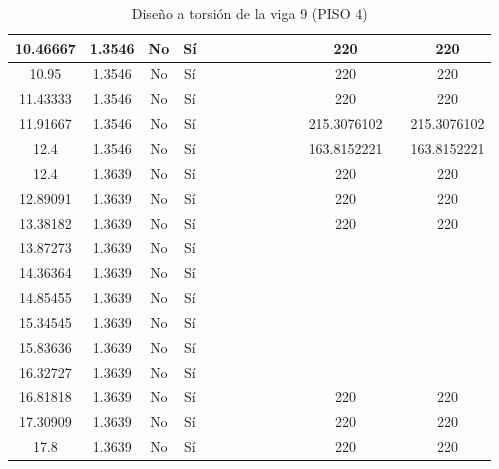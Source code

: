 \begin{table}[H]
{\begin{tabular}{|c|c|c|c|c|c|c|c|c|c|c|c|c|c|}
\hline
10.46667 & 1.3546 & No  & Sí  &     &     &     &     &     &     &     & 220 &     & 220 \bigstrut\\
\hline
10.95 & 1.3546 & No  & Sí  &     &     &     &     &     &     &     & 220 &     & 220 \bigstrut\\
\hline
11.43333 & 1.3546 & No  & Sí  &     &     &     &     &     &     &     & 220 &     & 220 \bigstrut\\
\hline
11.91667 & 1.3546 & No  & Sí  &     &     &     &     &     &     &     & 215.3076102 &     & 215.3076102 \bigstrut\\
\hline
12.4 & 1.3546 & No  & Sí  &     &     &     &     &     &     &     & 163.8152221 &     & 163.8152221 \bigstrut\\
\hline
12.4 & 1.3639 & No  & Sí  &     &     &     &     &     &     &     & 220 &     & 220 \bigstrut\\
\hline
12.89091 & 1.3639 & No  & Sí  &     &     &     &     &     &     &     & 220 &     & 220 \bigstrut\\
\hline
13.38182 & 1.3639 & No  & Sí  &     &     &     &     &     &     &     & 220 &     & 220 \bigstrut\\
\hline
13.87273 & 1.3639 & No  & Sí  &     &     &     &     &     &     &     &     &     &  \bigstrut\\
\hline
14.36364 & 1.3639 & No  & Sí  &     &     &     &     &     &     &     &     &     &  \bigstrut\\
\hline
14.85455 & 1.3639 & No  & Sí  &     &     &     &     &     &     &     &     &     &  \bigstrut\\
\hline
15.34545 & 1.3639 & No  & Sí  &     &     &     &     &     &     &     &     &     &  \bigstrut\\
\hline
15.83636 & 1.3639 & No  & Sí  &     &     &     &     &     &     &     &     &     &  \bigstrut\\
\hline
16.32727 & 1.3639 & No  & Sí  &     &     &     &     &     &     &     &     &     &  \bigstrut\\
\hline
16.81818 & 1.3639 & No  & Sí  &     &     &     &     &     &     &     & 220 &     & 220 \bigstrut\\
\hline
17.30909 & 1.3639 & No  & Sí  &     &     &     &     &     &     &     & 220 &     & 220 \bigstrut\\
\hline
17.8 & 1.3639 & No  & Sí  &     &     &     &     &     &     &     & 220 &     & 220 \bigstrut\\
\hline
\end{tabular}%



  }
      \caption{Diseño a torsión de la viga 9 (PISO 4) }
  \label{tab:T VG9 P4 }%
\end{table}%
